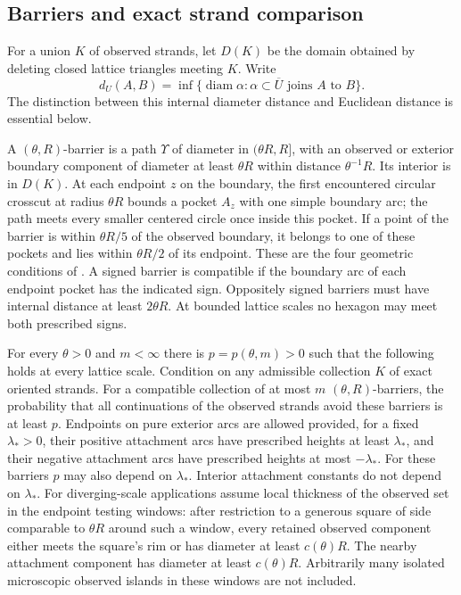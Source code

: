 \subsection{Barriers and exact strand comparison}

For a union \(K\) of observed strands, let \(D(K)\) be the domain obtained
by deleting closed lattice triangles meeting \(K\). Write
\[
 d_U(A,B)=\inf\{\operatorname{diam}\alpha:
       \alpha\subset\overline U\text{ joins }A\text{ to }B\}.
\]
The distinction between this internal diameter distance and Euclidean
distance is essential below.

A \((\theta,R)\)-barrier is a path \(\Upsilon\) of diameter in
\((\theta R,R]\), with an observed or exterior boundary component of
diameter at least \(\theta R\) within distance \(\theta^{-1}R\).
Its interior is in \(D(K)\). At each endpoint \(z\) on the boundary,
the first encountered circular crosscut at radius \(\theta R\) bounds
a pocket \(A_z\) with one simple boundary arc; the path meets every
smaller centered circle once inside this pocket. If a point of the
barrier is within \(\theta R/5\) of the observed boundary, it belongs
to one of these pockets and lies within \(\theta R/2\) of its endpoint.
These are the four geometric conditions of
\cite[Section 3.4]{SSdiscrete}. A signed barrier is compatible if the
boundary arc of each endpoint pocket has the indicated sign.
Oppositely signed barriers must have internal distance at least
\(2\theta R\). At bounded lattice scales no hexagon may meet both
prescribed signs.

\begin{proposition}\label{g:barriers}
For every \(\theta>0\) and \(m<\infty\) there is
\(p=p(\theta,m)>0\) such that the following holds at every lattice scale.
Condition on any admissible collection \(K\) of exact oriented strands.
For a compatible collection of at most \(m\) \((\theta,R)\)-barriers,
the probability that all continuations of the observed strands avoid
these barriers is at least \(p\). Endpoints on pure exterior arcs are
allowed provided, for a fixed \(\lambda_*>0\), their positive attachment
arcs have prescribed heights at least \(\lambda_*\), and their negative
attachment arcs have prescribed heights at most \(-\lambda_*\).
For these barriers \(p\) may also depend on \(\lambda_*\).
Interior attachment constants do not depend on \(\lambda_*\).
For diverging-scale applications assume local thickness of the observed
set in the endpoint testing windows: after restriction to a generous
square of side comparable to \(\theta R\) around such a window,
every retained observed component either meets the square's rim or
has diameter at least \(c(\theta)R\). The nearby attachment component
has diameter at least \(c(\theta)R\). Arbitrarily many isolated
microscopic observed islands in these windows are not included.
\end{proposition}

